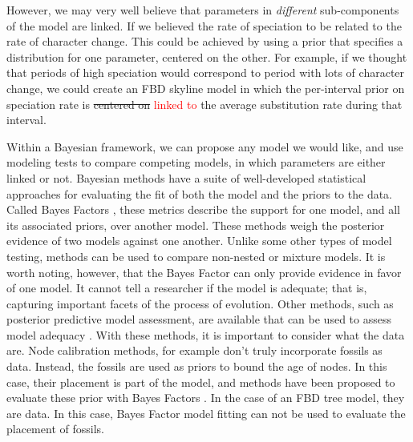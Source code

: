 \documentclass[11pt]{article}
\newcommand{\edit}[1]{{\textcolor{red}{#1}}} %
\begin{document}
However, we may very well believe that parameters in \textit{different} sub-components of the model are linked. 
If we believed the rate of speciation to be related to the rate of character change. 
This could be achieved by using a prior that specifies a distribution for one parameter, centered on the other. 
For example, if we thought that periods of high speciation would correspond to period with lots of character change, we could create an FBD skyline model in which the per-interval prior on speciation rate is \sout{centered on} \edit{linked to} the average substitution rate during that interval.


Within a Bayesian framework, we can propose any model we would like, and use modeling tests to compare competing models, in which parameters are either linked or not.
Bayesian methods have a suite of well-developed statistical approaches for evaluating the fit of both the model and the priors to the data.
Called Bayes Factors \cite{Xie2011}, these metrics describe the support for one model, and all its associated priors, over another model. 
These methods weigh the posterior evidence of two models against one another. 
Unlike some other types of model testing, methods can be used to compare non-nested or mixture models.
It is worth noting, however, that the Bayes Factor can only provide evidence in favor of one model.
It cannot tell a researcher if the model is adequate; that is, capturing important facets of the process of evolution.
Other methods, such as posterior predictive model assessment, are available that can be used to assess model adequacy \cite{Brown2009, Brown2014}.
With these methods, it is important to consider what the data are.
Node calibration methods, for example don't truly incorporate fossils as data.
Instead, the fossils are used as priors to bound the age of nodes.
In this case, their placement is part of the model, and methods have been proposed to evaluate these prior with Bayes Factors \cite{Andujar2014}. %
In the case of an FBD tree model, they are data.
In this case, Bayes Factor model fitting can not be used to evaluate the placement of fossils.
\end{document}
